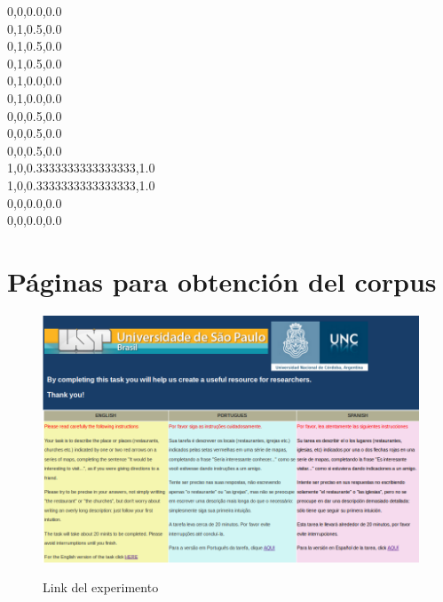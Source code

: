 0,0,0.0,0.0\\
0,1,0.5,0.0\\
0,1,0.5,0.0\\
0,1,0.5,0.0\\
0,1,0.0,0.0\\
0,1,0.0,0.0\\
0,0,0.5,0.0\\
0,0,0.5,0.0\\
0,0,0.5,0.0\\
1,0,0.3333333333333333,1.0\\
1,0,0.3333333333333333,1.0\\
0,0,0.0,0.0\\
0,0,0.0,0.0\\



\chapter{P\'aginas para obtenci\'on del corpus}
\label{corpus-apendice}

%

\begin{figure}[ht]
\begin{center}
\includegraphics[width=13cm]{images/pagPrincipal.png}\\[0pt]
\caption{Link del experimento}
\label{fig-pagPrincipal}
\end{center}
\end{figure}

